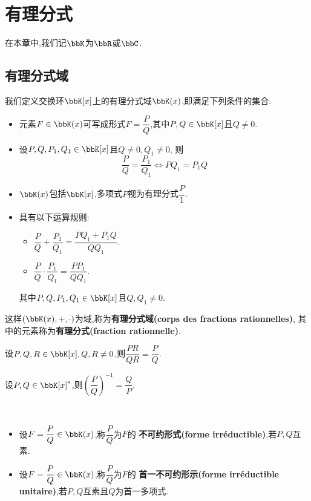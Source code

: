 \chapter{有理分式}

在本章中,我们记$\bbK$为$\bbR$或$\bbC$.

\section{有理分式域}

我们定义交换环$\bbK[x]$上的有理分式域$\bbK(x)$,即满足下列条件的集合.

\begin{itemize}
    \item 元素$F \in \bbK(x)$可写成形式$F = \dfrac{P}{Q}$,其中$P, Q \in \bbK[x]$且$Q \neq 0$.
    \item 设$P, Q, P_1, Q_1 \in \bbK[x]$且$Q \neq 0, Q_1 \neq 0$,
        则\[ \dfrac{P}{Q} = \dfrac{P_1}{Q_1} \iff PQ_1 = P_1Q \]
    \item $\bbK(x)$包括$\bbK[x]$,多项式$P$视为有理分式$\dfrac{P}{1}$.
    \item 具有以下运算规则:
        \begin{itemize}
            \item $\dfrac{P}{Q} +\dfrac{P_1}{Q_1} = \dfrac{PQ_1 + P_1Q}{QQ_1}$.
            \item $\dfrac{P}{Q} \cdot \dfrac{P_1}{Q_1} = \dfrac{PP_1}{QQ_1}$.
        \end{itemize}
        其中$P, Q, P_1, Q_1 \in \bbK[x]$且$Q, Q_1 \neq 0$.
\end{itemize}

这样$(\bbK(x), +, \cdot)$为域,称为\textbf{有理分式域(corps des fractions rationnelles)},
其中的元素称为\textbf{有理分式(fraction rationnelle)}.

\begin{rqq}
    设$P, Q, R \in \bbK[x], Q, R \neq 0$,则$\dfrac{PR}{QR} = \dfrac{P}{Q}$.

    设$P, Q \in \bbK[x]^*$,则$\left( \dfrac{P}{Q} \right)^{- 1} = \dfrac{Q}{P}$.
\end{rqq}

\begin{deff} $\ $
    \begin{itemize}
        \item 设$F = \dfrac{P}{Q} \in \bbK(x)$,称$\dfrac{P}{Q}$为$F$的
            \textbf{不可约形式(forme irréductible)},若$P, Q$互素.
        \item 设$F = \dfrac{P}{Q} \in \bbK(x)$,称$\dfrac{P}{Q}$为$F$的
            \textbf{首一不可约形示(forme irréductible unitaire)},若$P, Q$互素且$Q$为首一多项式.
    \end{itemize}  
\end{deff}

